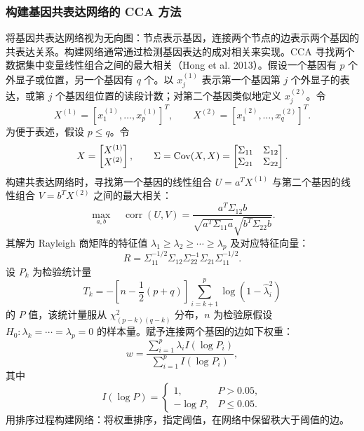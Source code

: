 \subsubsection{构建基因共表达网络的 CCA 方法}
将基因共表达网络视为无向图：节点表示基因，连接两个节点的边表示两个基因的共表达关系。构建网络通常通过检测基因表达的成对相关来实现。CCA 寻找两个数据集中变量线性组合之间的最大相关（Hong et al. 2013）。假设一个基因有 $p$ 个外显子或位置，另一个基因有 $q$ 个。以 $x_j^{(1)}$ 表示第一个基因第 $j$ 个外显子的表达，或第 $j$ 个基因组位置的读段计数；对第二个基因类似地定义 $x_j^{(2)}$。令
\[
X^{(1)}=[x_1^{(1)},\ldots,x_p^{(1)}]^T,\qquad
X^{(2)}=[x_1^{(2)},\ldots,x_q^{(2)}]^T.
\]
为便于表述，假设 $p\le q$。令
\[
X=\begin{bmatrix}X^{(1)}\\X^{(2)}\end{bmatrix},\qquad
\Sigma=\operatorname{Cov}(X,X)=\begin{bmatrix}\Sigma_{11}&\Sigma_{12}\\\Sigma_{21}&\Sigma_{22}\end{bmatrix}.
\]
构建共表达网络时，寻找第一个基因的线性组合 $U=a^TX^{(1)}$ 与第二个基因的线性组合 $V=b^TX^{(2)}$ 之间的最大相关：
\begin{equation}
\max_{a,b}\quad\operatorname{corr}(U,V)
=\frac{a^T\Sigma_{12}b}{\sqrt{a^T\Sigma_{11}a}\sqrt{b^T\Sigma_{22}b}}.
\tag{4.143}
\end{equation}
其解为 Rayleigh 商矩阵的特征值 $\lambda_1\ge\lambda_2\ge\cdots\ge\lambda_p$ 及对应特征向量：
\[
R=\Sigma_{11}^{-1/2}\Sigma_{12}\Sigma_{22}^{-1}\Sigma_{21}\Sigma_{11}^{-1/2}.
\]
设 $P_k$ 为检验统计量
\[
T_k=-\left[n-\frac12(p+q)\right]\sum_{i=k+1}^{p}\log(1-\hat\lambda_i^2)
\]
的 $P$ 值，该统计量服从 $\chi^2_{(p-k)(q-k)}$ 分布，$n$ 为检验原假设 $H_0:\lambda_k=\cdots=\lambda_p=0$ 的样本量。赋予连接两个基因的边如下权重：
\begin{equation}
w=\frac{\sum_{i=1}^{p}\lambda_iI(\log P_i)}{\sum_{i=1}^{p}I(\log P_i)},
\tag{4.144}
\end{equation}
其中
\[
I(\log P)=\begin{cases}1,&P>0.05,\\-\log P,&P\le0.05.\end{cases}
\]
用排序过程构建网络：将权重排序，指定阈值，在网络中保留秩大于阈值的边。

